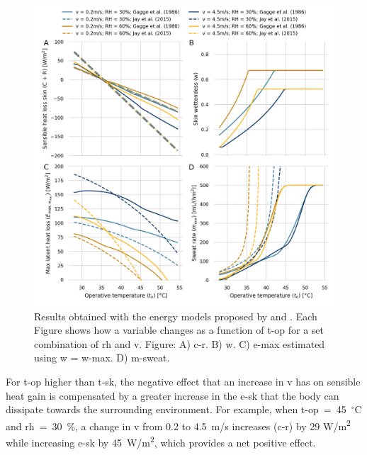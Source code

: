 \begin{figure}[thb!]
    \centering
    \includegraphics[width=\textwidth]{figures/comparison_models_v2}
    \caption{Results obtained with the energy models proposed by  and .
    Each Figure shows how a variable changes as a function of \ac{t-op} for a set combination of \ac{rh} and \ac{v}.
    Figure: A) \Acf{c-r}.
    B) \Acf{w}.
    C) \Acf{e-max} estimated using \ac{w} = \ac{w-max}.
    D) \Acf{m-sweat}.}
    \label{fig:comparison_models}
\end{figure}



For \ac{t-op} higher than \ac{t-sk}, the negative effect that an increase in \ac{v} has on sensible heat gain is compensated by a greater increase in the \acf{e-sk} that the body can dissipate towards the surrounding environment.
For example, when \ac{t-op}~=~45~$^{\circ}$C and \ac{rh}~=~30~\%, a change in \ac{v} from 0.2 to 4.5~m/s increases (\acs{c-r}) by 29 W/m\textsuperscript{2} while increasing \ac{e-sk} by 45~W/m\textsuperscript{2}, which provides a net positive effect.

